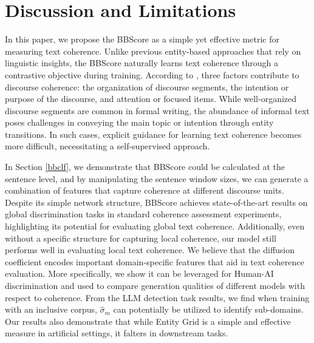 \documentclass[letterpaper]{article} %
\begin{document}
\section{Discussion and Limitations}
In this paper, we propose the BBScore as a simple yet effective metric for measuring text coherence. Unlike previous entity-based approaches that rely on linguistic insights, the BBScore naturally learns text coherence through a contrastive objective during training. According to \cite{grosz-sidner-1986-attention}, three factors contribute to discourse coherence: the organization of discourse segments, the intention or purpose of the discourse, and attention or focused items. While well-organized discourse segments are common in formal writing, the abundance of informal text poses challenges in conveying the main topic or intention through entity transitions. In such cases, explicit guidance for learning text coherence becomes more difficult, necessitating a self-supervised approach. 

In Section \ref{bbclf}, we demonstrate that BBScore could be calculated at the sentence level, and by manipulating the sentence window sizes, we can generate a combination of features that capture coherence at different discourse units. Despite its simple network structure, BBScore achieves state-of-the-art results on global discrimination tasks in standard coherence assessment experiments, highlighting its potential for evaluating global text coherence. Additionally, even without a specific structure for capturing local coherence, our model still performs well in evaluating local text coherence. We believe that the diffusion coefficient encodes important domain-specific features that aid in text coherence evaluation. More specifically, we show it can be leveraged for Human-AI discrimination and used to compare generation qualities of different models with respect to coherence. From the LLM detection task results, we find when training with an inclusive corpus, $\hat\sigma_m$ can potentially be utilized to identify sub-domains. %
Our results also demonstrate that while Entity Grid is a simple and effective measure in artificial settings, it falters in downstream tasks.
\end{document}

